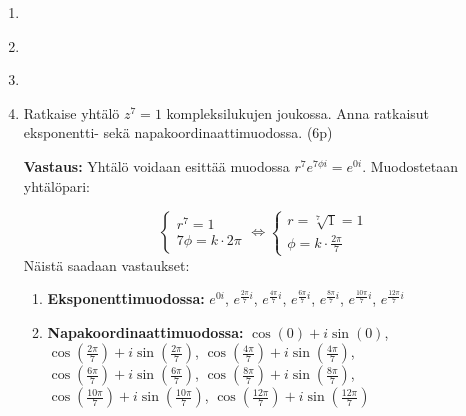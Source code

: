 \documentclass[a4paper,12pt]{article}
\begin{document}
 

\otsikko

\begin{enumerate}

\item 
    \begin{enumerate}
    \end{enumerate}
    
\item 
\begin{enumerate}
\end{enumerate}

\item

\item Ratkaise yhtälö $z^7=1$ kompleksilukujen joukossa. Anna ratkaisut eksponentti- sekä napakoordinaattimuodossa. (6p)

\textbf{Vastaus:} Yhtälö voidaan esittää muodossa $r^7e^{7\phi i}=e^{0i}$. Muodostetaan yhtälöpari:

\begin{equation*}
    \begin{cases}
    r^7=1 \\
    7\phi = k \cdot 2\pi 
    \end{cases}
    \Longleftrightarrow
    \begin{cases}
        r=\sqrt[7]{1}=1 \\
        \phi=k\cdot \frac{2\pi}{7}
    \end{cases}
\end{equation*}
Näistä saadaan vastaukset:
\begin{enumerate}
    \item \textbf{Eksponenttimuodossa:} $e^{0i}$, $e^{\frac{2\pi}{7}i}$, $e^{\frac{4\pi}{7}i}$, $e^{\frac{6\pi}{7}i}$, $e^{\frac{8\pi}{7}i}$, $e^{\frac{10\pi}{7}i}$, $e^{\frac{12\pi}{7}i}$ \\
    \item \textbf{Napakoordinaattimuodossa:} $\cos(0)+i \sin(0)$, $\cos(\frac{2\pi}{7})+i \sin(\frac{2\pi}{7})$, $\cos(\frac{4\pi}{7})+i \sin(\frac{4\pi}{7})$, $\cos(\frac{6\pi}{7})+i \sin(\frac{6\pi}{7})$, $\cos(\frac{8\pi}{7})+i \sin(\frac{8\pi}{7})$, $\cos(\frac{10\pi}{7})+i \sin(\frac{10\pi}{7})$, $\cos(\frac{12\pi}{7})+i \sin(\frac{12\pi}{7})$
\end{enumerate}

\end{enumerate}
\end{document}
